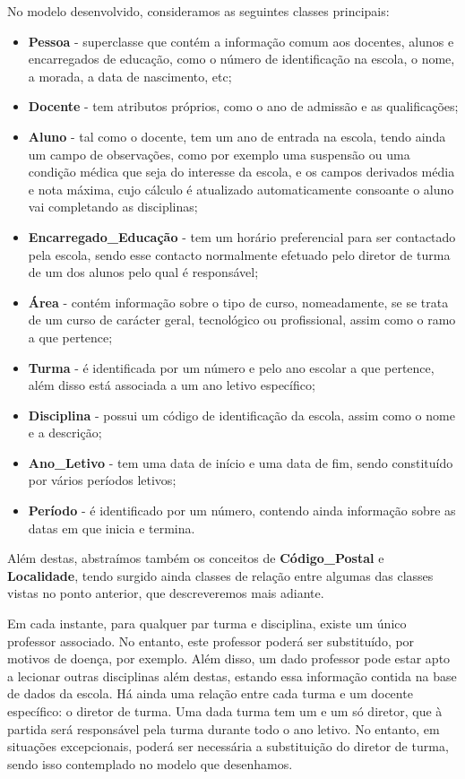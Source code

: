 \documentclass[12pt,a4paper,reqno]{report}
\numberwithin{figure}{section}
\numberwithin{equation}{section}
\begin{document}
No modelo desenvolvido, consideramos as seguintes classes principais:
\begin{itemize}
\item \textbf{Pessoa} - superclasse que contém a informação comum aos docentes, alunos e encarregados de educação, como o número de identificação na escola, o nome, a morada, a data de nascimento, etc;
\item \textbf{Docente} - tem atributos próprios, como o ano de admissão e as qualificações;
\item \textbf{Aluno} - tal como o docente, tem um ano de entrada na escola, tendo ainda um campo de observações, como por exemplo uma suspensão ou uma condição médica que seja do interesse da escola, e os campos derivados média e nota máxima, cujo cálculo é atualizado automaticamente consoante o aluno vai completando as disciplinas;
\item \textbf{Encarregado\_Educação} - tem um horário preferencial para ser contactado pela escola, sendo esse contacto normalmente efetuado pelo diretor de turma de um dos alunos pelo qual é responsável;
\item \textbf{Área} - contém informação sobre o tipo de curso, nomeadamente, se se trata de um curso de carácter geral, tecnológico ou profissional, assim como o ramo a que pertence;
\item \textbf{Turma} - é identificada por um número e pelo ano escolar a que pertence, além disso está associada a um ano letivo específico;
\item \textbf{Disciplina} - possui um código de identificação da escola, assim como o nome e a descrição;
\item \textbf{Ano\_Letivo} - tem uma data de início e uma data de fim, sendo constituído por vários períodos letivos;
\item \textbf{Período} - é identificado por um número, contendo ainda informação sobre as datas em que inicia e termina.
\end{itemize}

Além destas, abstraímos também os conceitos de \textbf{Código\_Postal} e \textbf{Localidade}, tendo surgido ainda classes de relação entre algumas das classes vistas no ponto anterior, que descreveremos mais adiante.

Em cada instante, para qualquer par turma e disciplina, existe um único professor associado. No entanto, este professor poderá ser substituído, por motivos de doença, por exemplo. Além disso, um dado professor pode estar apto a lecionar outras disciplinas além destas, estando essa informação contida na base de dados da escola. Há ainda uma relação entre cada turma e um docente específico: o diretor de turma. Uma dada turma tem um e um só diretor, que à partida será responsável pela turma durante todo o ano letivo. No entanto, em situações excepcionais, poderá ser necessária a substituição do diretor de turma, sendo isso contemplado no modelo que desenhamos.
\end{document}
